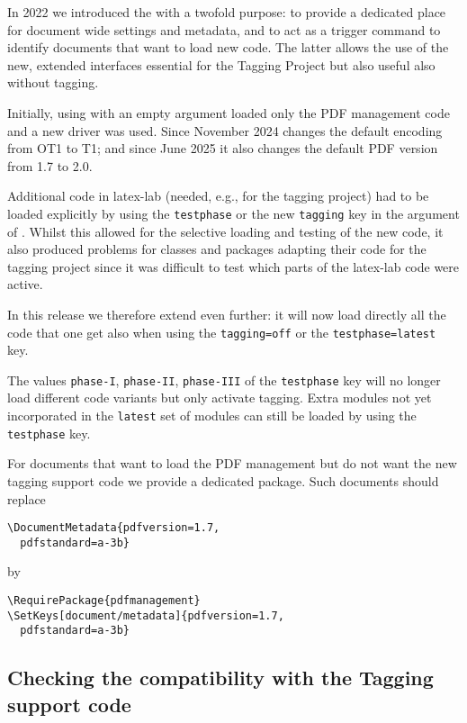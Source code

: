 \documentclass{ltnews}
\begin{document}
In 2022 we introduced the  with a twofold
purpose: to provide a dedicated place for document wide settings and
metadata, and to act as a trigger command to identify documents that
want to load new code.  The latter allows the use of the new, extended
interfaces essential for the Tagging Project but also useful also
without tagging.

Initially, using  with an empty argument loaded
only the PDF management code and a new  driver was used.
Since November 2024  changes the default encoding
from OT1 to T1; and since June 2025 it also changes the default PDF
version from 1.7 to 2.0.

Additional code in latex-lab (needed, e.g., for the tagging project)
had to be loaded explicitly by using the \texttt{testphase} or the new
\texttt{tagging} key in the argument of . Whilst
this allowed for the selective loading and testing of the new code, it
also produced problems for classes and packages adapting their code
for the tagging project since it was difficult to test which parts of
the latex-lab code were active.

In this release we therefore extend  even
further: it will now load directly all the code that one get also when
using the \texttt{tagging=off} or the \texttt{testphase=latest} key.

The values \texttt{phase-I}, \texttt{phase-II}, \texttt{phase-III} of
the \texttt{testphase} key will no longer load different code variants
but only activate tagging. Extra modules not yet incorporated in the
\texttt{latest} set of modules can still be loaded by using the
\texttt{testphase} key.

For documents that want to load the PDF management but do not want the
new tagging support code we provide a dedicated package. Such
documents should replace
\begin{verbatim}
\DocumentMetadata{pdfversion=1.7,
  pdfstandard=a-3b}
\end{verbatim}
by
\begin{verbatim}
\RequirePackage{pdfmanagement}
\SetKeys[document/metadata]{pdfversion=1.7,
  pdfstandard=a-3b}
\end{verbatim}

\subsection{Checking the compatibility with the Tagging support code}
\end{document}
